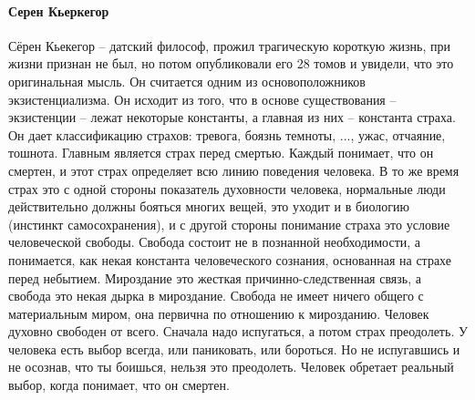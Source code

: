 \documentclass[a4paper, 12pt]{article}
\begin{document}
\paragraph{Серен Кьеркегор} Сёрен Кьекегор -- датский философ, прожил трагическую короткую жизнь, при жизни признан не был, но потом опубликовали его 28 томов и увидели, что это оригинальная мысль. Он считается одним из основоположников экзистенциализма. Он исходит из того, что в основе существования -- экзистенции -- лежат некоторые константы, а главная из них -- константа страха. Он дает классификацию страхов: тревога, боязнь темноты, ..., ужас, отчаяние, тошнота. Главным является страх перед смертью. Каждый понимает, что он смертен, и этот страх определяет всю линию поведения человека. В то же время страх это с одной стороны показатель духовности человека, нормальные люди действительно должны бояться многих вещей, это уходит и в биологию (инстинкт самосохранения), и с другой стороны понимание страха это условие человеческой свободы. Свобода состоит не в познанной необходимости, а понимается, как некая константа человеческого сознания, основанная на страхе перед небытием. Мироздание это жесткая причинно-следственная связь, а свобода это некая дырка в мироздание. Свобода не имеет ничего общего с материальным миром, она первична по отношению к мирозданию. Человек духовно свободен от всего. Сначала надо испугаться, а потом страх преодолеть. У человека есть выбор всегда, или паниковать, или бороться. Но не испугавшись и не осознав, что ты боишься, нельзя это преодолеть. Человек обретает реальный выбор, когда понимает, что он смертен.
\end{document}
